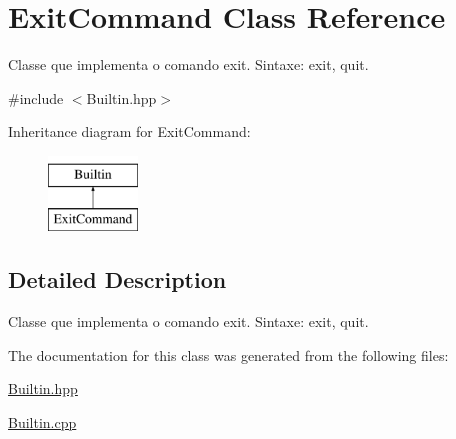 \hypertarget{classExitCommand}{
\section{ExitCommand Class Reference}
\label{classExitCommand}
}


Classe que implementa o comando exit. Sintaxe: exit, quit.  




{\ttfamily \#include $<$Builtin.hpp$>$}

Inheritance diagram for ExitCommand:\begin{figure}[H]
\begin{center}
\leavevmode
\includegraphics[height=2.000000cm]{classExitCommand}
\end{center}
\end{figure}


\subsection{Detailed Description}
Classe que implementa o comando exit. Sintaxe: exit, quit. 

The documentation for this class was generated from the following files:\begin{DoxyCompactItemize}
\item 
\hyperlink{Builtin_8hpp}{Builtin.hpp}\item 
\hyperlink{Builtin_8cpp}{Builtin.cpp}\end{DoxyCompactItemize}
